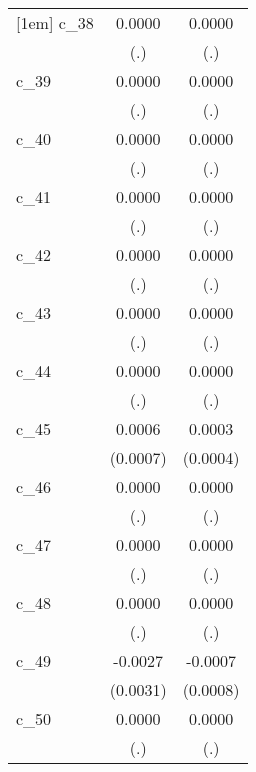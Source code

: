 {\begin{tabular}{l*{2}{c}}
[1em]
c\_38        &      0.0000        &      0.0000        \\
            &         (.)        &         (.)        \\
[1em]
c\_39        &      0.0000        &      0.0000        \\
            &         (.)        &         (.)        \\
[1em]
c\_40        &      0.0000        &      0.0000        \\
            &         (.)        &         (.)        \\
[1em]
c\_41        &      0.0000        &      0.0000        \\
            &         (.)        &         (.)        \\
[1em]
c\_42        &      0.0000        &      0.0000        \\
            &         (.)        &         (.)        \\
[1em]
c\_43        &      0.0000        &      0.0000        \\
            &         (.)        &         (.)        \\
[1em]
c\_44        &      0.0000        &      0.0000        \\
            &         (.)        &         (.)        \\
[1em]
c\_45        &      0.0006        &      0.0003        \\
            &    (0.0007)        &    (0.0004)        \\
[1em]
c\_46        &      0.0000        &      0.0000        \\
            &         (.)        &         (.)        \\
[1em]
c\_47        &      0.0000        &      0.0000        \\
            &         (.)        &         (.)        \\
[1em]
c\_48        &      0.0000        &      0.0000        \\
            &         (.)        &         (.)        \\
[1em]
c\_49        &     -0.0027        &     -0.0007        \\
            &    (0.0031)        &    (0.0008)        \\
[1em]
c\_50        &      0.0000        &      0.0000        \\
            &         (.)        &         (.)        \\

\end{tabular}}
